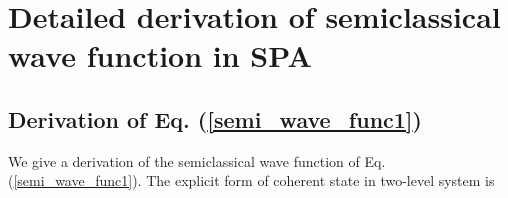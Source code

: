 \documentclass[11pt]{book} %
\begin{document}


\clearpage{\pagestyle{empty}\cleardoublepage}
\chapter{Detailed derivation of semiclassical wave function in SPA}
\section{Derivation of Eq. (\ref{semi_wave_func1})}
\label{wave_func1}

We give a derivation of the semiclassical wave function
of Eq. (\ref{semi_wave_func1}).
The explicit form of coherent state in two-level system is
\end{document}
